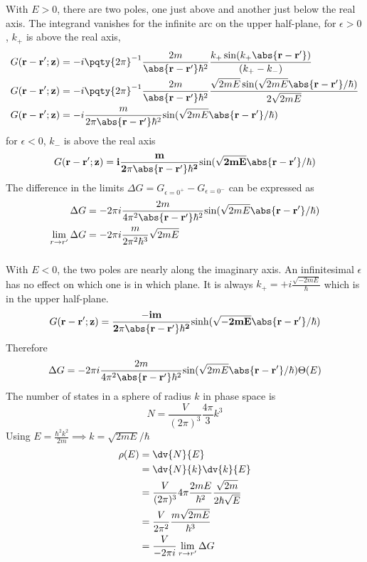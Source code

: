 \documentclass[12pt]{article}
\begin{document}
    \subsubsection{} With \(E > 0\), there are two poles, one just above and another just below the real axis. The integrand vanishes for the infinite arc on the upper half-plane, for \(\epsilon > 0\), \(k_ +\) is above the real axis, \begin{align*}
        G(\bf r - \bf r'; z) &= - i\pqty{2\pi}^{- 1} \frac{2m}{\abs{\bf{r - r'}}\hbar^2} \frac{k_ +\sin(k_ +\abs{\bf{r - r'}})}{  (k_ + - k_ -) } \\
        G(\bf r - \bf r'; z) &= - i\pqty{2\pi}^{- 1} \frac{2m}{\abs{\bf{r - r'}}\hbar^2} \frac{\sqrt{2mE}\sin(\sqrt{2mE}\abs{\bf{r - r'}}/\hbar)  }{ 2 \sqrt{2mE} } \\
        G(\bf r - \bf r'; z) &= - i \frac{m}{2\pi\abs{\bf{r - r'}}\hbar^2} {\sin(\sqrt{2mE}\abs{\bf{r - r'}}  /\hbar)} 
    \end{align*}
    for \(\epsilon < 0\), \(k_ -\) is above the real axis\[
        G(\bf r - \bf r'; z) = i \frac{m}{2\pi\abs{\bf{r - r'}}\hbar^2} {\sin(\sqrt{2mE}\abs{\bf{r - r'}}  /\hbar)} 
    \]
    The difference in the limits \(\Delta G = G_{\epsilon = 0^ +} - G_{\epsilon = 0^ -}\) can be expressed as \begin{align*}
        \Delta  G &= - 2\pi i \frac{2m}{4\pi^2\abs{\bf{r - r'}}\hbar^2} {\sin(\sqrt{2mE}\abs{\bf{r - r'}}  /\hbar)}\\ 
        \lim_{r \to r'}\Delta  G &= - 2\pi i \frac{m}{2\pi^2\hbar^3} \sqrt{2mE} 
    \end{align*} 
    \subsubsection{} With \(E < 0\), the two poles are nearly along the imaginary axis. An infinitesimal \(\epsilon\) has no effect on which one is in which plane. It is always \(k_ + = + i \frac{\sqrt{ - 2mE}}{\hbar} \) which is in the upper half-plane. \[
        G(\bf r - \bf r'; z) = \frac{ - i m}{2\pi\abs{\bf{r - r'}}\hbar^2} {\sinh(\sqrt{ -2mE}\abs{\bf{r - r'}}  /\hbar)} 
    \]
     Therefore \[
        \Delta G = - 2\pi i \frac{2m}{4\pi^2\abs{\bf{r - r'}}\hbar^2} {\sin(\sqrt{2mE}\abs{\bf{r - r'}}  /\hbar)} \Theta (E)
    \]
    The number of states in a sphere of radius \(k\) in phase space is\[
        N = \frac{V}{(2\pi)^3} \frac{4\pi}{3} k^3
    \] Using \(E = \frac{\hbar^2k^2}{2m} \implies k = \sqrt{2mE}  /\hbar\)
    \begin{align*}
        \rho(E) &= \dv{N}{E}\\
        &= \dv{N}{k} \dv{k}{E}\\
        &= \frac{V}{(2\pi)^3} 4\pi \frac{2mE}{\hbar^2} \frac{\sqrt{2m}}{2\hbar \sqrt{E}}\\
        &= \frac{V}{2\pi^2} \frac{m \sqrt{2mE}}{\hbar^3} \\
        &= \frac{V}{ -2\pi i} \lim_{r \to r'}\Delta G
    \end{align*}
\end{document}
